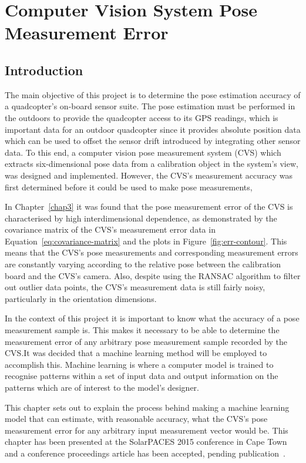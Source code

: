 \chapter[CVS Pose Measurement Error]{Computer Vision System Pose Measurement Error}
\label{chap4}

\section{Introduction}

The main objective of this project is to determine the pose estimation accuracy of a quadcopter's on-board sensor suite. The pose estimation must be performed in the outdoors to provide the quadcopter access to its GPS readings, which is important data for an outdoor quadcopter since it provides absolute position data which can be used to offset the sensor drift introduced by integrating other sensor data. To this end, a computer vision pose measurement system (CVS) which extracts six-dimensional pose data from a calibration object in the system's view, was designed and implemented. However,  the CVS's measurement accuracy was first determined before it could be used to make pose measurements, 

In Chapter~\ref{chap3} it was found that the pose measurement error of the CVS is characterised by high interdimensional dependence, as demonstrated by the covariance matrix of the CVS's measurement error data in Equation~\ref{eq:covariance-matrix} and the plots in Figure~\ref{fig:err-contour}. This means that the CVS's pose measurements and corresponding measurement errors are constantly varying according to the relative pose between the calibration board and the CVS's camera. Also, despite using the RANSAC algorithm to filter out outlier data points, the CVS's measurement data is still fairly noisy, particularly in the orientation dimensions.

In the context of this project it is important to know what the accuracy of a pose measurement sample is. This makes it necessary to be able to determine the measurement error of any arbitrary pose measurement sample recorded by the CVS.\@ It was decided that a machine learning method will be employed to accomplish this. Machine learning is where a computer model is trained to recognise patterns within a set of input data and output information on the patterns which are of interest to the model's designer. 

This chapter sets out to explain the process behind making a machine learning model that can estimate, with reasonable accuracy, what the CVS's pose measurement error for any arbitrary input measurement vector would be. This chapter has been presented at the SolarPACES 2015 conference in Cape Town and a conference proceedings article has been accepted, pending publication~\citep{lock2015}. 

